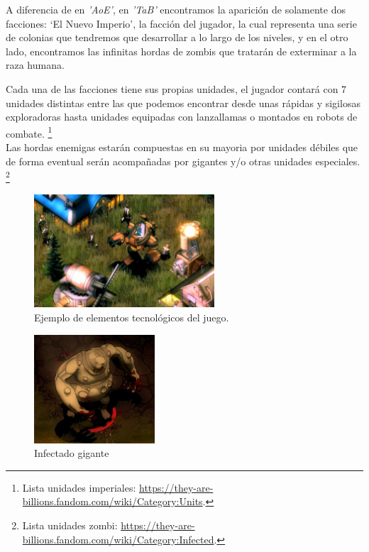 A diferencia de en \textit{'\ac{AoE}'}, en \textit{'\ac{TaB}'} encontramos la aparición de solamente dos facciones:
`El Nuevo Imperio', la facción del jugador, la cual representa una 
serie de colonias que tendremos que desarrollar a lo largo de los niveles, y en el otro lado, 
encontramos las infinitas hordas de zombis que tratarán de exterminar a la raza humana.

Cada una de las facciones tiene sus propias unidades, el jugador contará con 7 unidades distintas
entre las que podemos encontrar desde unas rápidas y sigilosas exploradoras hasta unidades equipadas
con lanzallamas o montados en robots de combate. \footnote{Lista unidades imperiales: \url{https://they-are-billions.fandom.com/wiki/Category:Units}.}
\\Las hordas enemigas estarán compuestas en su mayoria por unidades débiles que de forma eventual
serán acompañadas por gigantes y/o otras unidades especiales.
\footnote{Lista unidades zombi: \url{https://they-are-billions.fandom.com/wiki/Category:Infected}.}

\begin{figure}[ht]
\centering
\includegraphics[width=0.6\textwidth]{imagenes/marco_teo/referentes/tab_2.png}
\caption{Ejemplo de elementos tecnológicos del juego.}
\label{img:tab_2}
\end{figure}

\begin{figure}[ht]
\centering
\includegraphics[width=0.4\textwidth]{imagenes/marco_teo/referentes/tab_3.png}
\caption{Infectado gigante}
\label{img:tab_3}
\end{figure}

